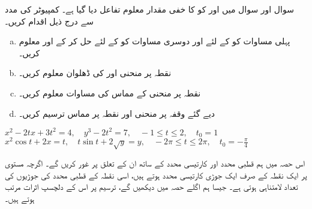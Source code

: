سوال  اور سوال  میں  اور  کو  کا خفی مقدار معلوم تفاعل دیا گیا ہے۔ کمپیوٹر کی مدد سے درج ذیل اقدام کریں۔
\begin{enumerate}[a.]
\item
پہلی مساوات کو  کے لئے اور دوسری مساوات کو  کے لئے حل کر کے  اور  معلوم کریں۔
\item
نقطہ  پر منحنی  اور  کی ڈھلوان معلوم کریں۔ 
\item
نقطہ  پر منحنی کے مماس کی مساوات معلوم کریں۔
\item
دیے گئے وقفہ پر منحنی اور نقطہ  پر مماس ترسیم کریں۔ 
\end{enumerate}

$x^2-2tx+3t^2=4,\quad y^3-2t^2=7,\quad -1\le t\le 2,\quad t_0=1$
$x^2\cos t+2x=t,\quad t\sin t+2\sqrt{y}=y,\quad -2\pi\le t\le 2\pi,\quad t_0=-\frac{\pi}{4}$

اس حصہ میں ہم قطبی محدد اور کارتیسی محدد کے ساتھ ان کے تعلق پر غور کریں گے۔ اگرچہ مستوی پر ایک نقطہ کے صرف ایک جوڑی کارتیسی محدد ہوتے ہیں، اسی نقطہ کے قطبی محدد کی جوڑیوں کی تعداد لامتناہی ہوتی ہے۔ جیسا ہم اگلے حصہ میں دیکھیں گے، ترسیم پر اس کے دلچسپ اثرات مرتب ہوتے ہیں۔

